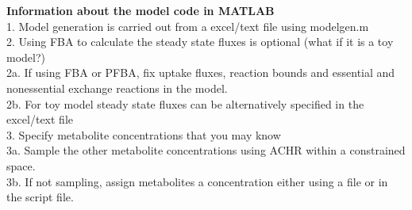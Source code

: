 \documentclass[10pt]{report}
\begin{document}
	\textbf{Information about the model code in MATLAB}\\
	
	1. Model generation is carried out from a excel/text file using modelgen.m\\
	
	2. Using FBA to calculate the steady state fluxes is optional (what if it is a toy model?)\\
	
		2a. If using FBA or PFBA, fix uptake fluxes, reaction bounds and essential and nonessential exchange reactions in the model.\\
		
		2b. For toy model steady state fluxes can be alternatively specified in the excel/text file\\	
			
	3. Specify metabolite concentrations that you may know\\
		
		3a. Sample the other metabolite concentrations using ACHR within a constrained space.\\
		
		3b. If not sampling, assign metabolites a concentration either using a file or in the script file.\\
			
\end{document}
